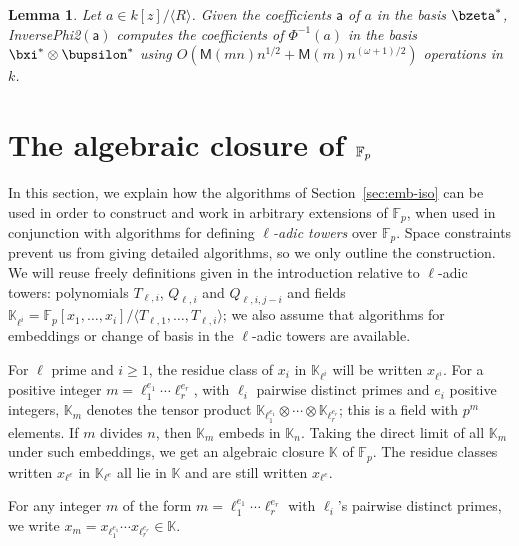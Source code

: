 \documentclass{sig-alternate}
\def\M {\ensuremath{\mathsf{M}}}
\def\F {\ensuremath{\mathbb{F}}}
\def\K {\ensuremath{\mathbb{K}}}
\def\va {\ensuremath{\mathsf{a}}}
\newcounter{algo}
\newcommand{\ang}[1]{\langle#1\rangle}
\newtheorem{Lemma}{Lemma}
\begin{document}
\begin{Lemma}\label{lemma:tiso2}
  Let $a\in k[z]/\ang{R}$. Given the coefficients $\va$ of $a$ in the
  basis $\bzeta^\ast$, {\sf InversePhi2}$(\va)$ computes the
  coefficients of $\Phi^{-1}(a)$ in the basis $\bxi^\ast \otimes
  \bupsilon^\ast$ using $O(\M(mn)n^{1/2}+\M(m) n^{(\omega+1)/2} )$
  operations in~$k$.
\end{Lemma}


{
\def\Fp{\F_p}
\section{The algebraic closure of \large$\protect\Fp$}\label{sec:fpbar}
}

In this section, we explain how the algorithms of
Section~\ref{sec:emb-iso} can be used in order to construct and work
in arbitrary extensions of $\F_p$, when used in conjunction with
algorithms for defining {\em $\ell$-adic towers} over $\F_p$. Space
constraints prevent us from giving detailed algorithms, so we only
outline the construction. We will reuse freely definitions given in
the introduction relative to $\ell$-adic towers: polynomials
$T_{\ell,i}$, $Q_{\ell,i}$ and $Q_{\ell,i,j-i}$ and fields
$\K_{\ell^i}=\F_p[x_1,\dots,x_i]/\langle
T_{\ell,1},\dots,T_{\ell,i}\rangle$; we also assume that algorithms
for embeddings or change of basis in the $\ell$-adic towers are
available.

\smallskip{} For $\ell$ prime and $i \ge 1$,
the residue class of $x_i$ in $\K_{\ell^i}$ will be written
$x_{\ell^i}$. For a positive integer $m=\ell_1^{e_1}\cdots
\ell_r^{e_r}$, with $\ell_i$ pairwise distinct primes and $e_i$
positive integers, $\K_m$ denotes the tensor product
$\K_{\ell_1^{e_1}} \otimes \cdots \otimes \K_{\ell_r^{e_r}}$; this is
a field with $p^m$ elements.  If $m$ divides $n$, then $\K_m$ embeds
in $\K_n$. Taking the direct limit of all $\K_m$ under such
embeddings, we get an algebraic closure $\K$ of $\F_p$. The residue
classes written $x_{\ell^e}$ in $\K_{\ell^e}$ all lie in $\K$ and are
still written $x_{\ell^e}$.

For any integer $m$ of the form $m=\ell_1^{e_1}\cdots \ell_r^{e_r}$
with $\ell_i$'s pairwise distinct primes, we write $x_m =
x_{\ell_1^{e_1}} \cdots x_{\ell_r^{e_r}} \in \K$.
\end{document}
